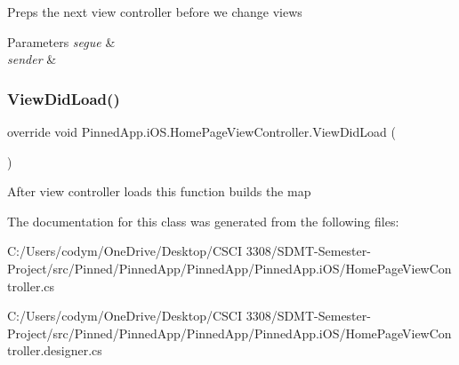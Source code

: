 Preps the next view controller before we change views 


\begin{DoxyParams}{Parameters}
{\em segue} & \\
\hline
{\em sender} & \\
\hline
\end{DoxyParams}
\mbox{\label{class_pinned_app_1_1i_o_s_1_1_home_page_view_controller_a055c6788c930eb678250ee9afb522c2a}} 
\subsubsection{\texorpdfstring{View\+Did\+Load()}{ViewDidLoad()}}
{\footnotesize\ttfamily override void Pinned\+App.\+i\+O\+S.\+Home\+Page\+View\+Controller.\+View\+Did\+Load (\begin{DoxyParamCaption}{ }\end{DoxyParamCaption})}



After view controller loads this function builds the map 



The documentation for this class was generated from the following files\+:\begin{DoxyCompactItemize}
\item 
C\+:/\+Users/codym/\+One\+Drive/\+Desktop/\+C\+S\+C\+I 3308/\+S\+D\+M\+T-\/\+Semester-\/\+Project/src/\+Pinned/\+Pinned\+App/\+Pinned\+App/\+Pinned\+App.\+i\+O\+S/Home\+Page\+View\+Controller.\+cs\item 
C\+:/\+Users/codym/\+One\+Drive/\+Desktop/\+C\+S\+C\+I 3308/\+S\+D\+M\+T-\/\+Semester-\/\+Project/src/\+Pinned/\+Pinned\+App/\+Pinned\+App/\+Pinned\+App.\+i\+O\+S/Home\+Page\+View\+Controller.\+designer.\+cs\end{DoxyCompactItemize}
